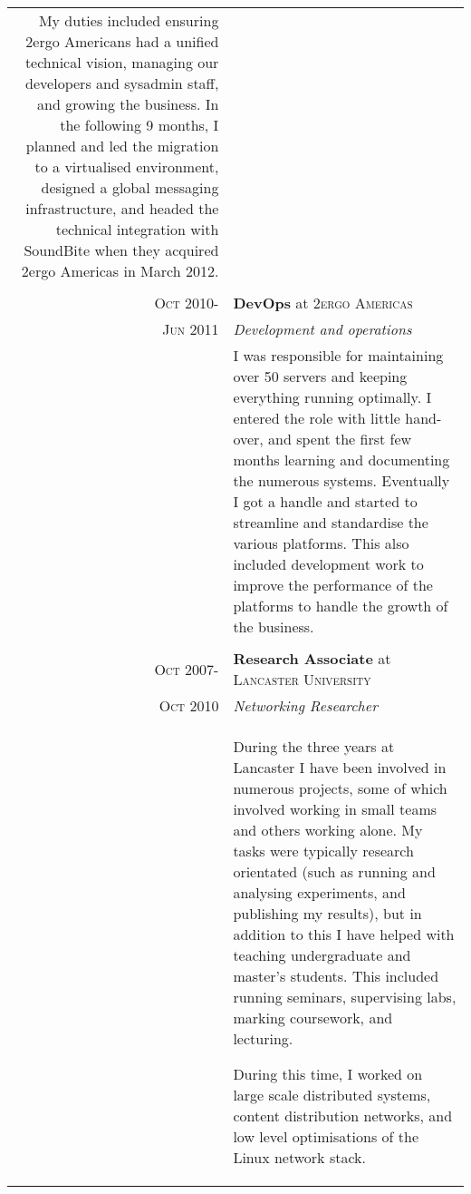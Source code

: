 \documentclass[letterpaper,10pt]{article}
\begin{document}
\begin{tabularx}{\textwidth}{r|X}
                        My duties included ensuring 
			2ergo Americans had a unified technical vision, managing our developers and sysadmin staff, and growing the business.
			In the following 9 months, I planned and led the migration to a virtualised environment, designed a global messaging
			infrastructure, and headed the technical integration with SoundBite when they acquired 2ergo Americas in March 2012. \\
&\\
 \textsc{Oct 2010-} & \textbf{DevOps} at \textsc{2ergo Americas} \\
 \textsc{Jun 2011}  & \emph{Development and operations}\\
                    & I was responsible for maintaining over 50 servers and keeping everything running optimally. 
			I entered the role with little hand-over, and spent the first few months learning and documenting the numerous systems.
			Eventually I got a handle and started to streamline and standardise the various platforms. This also included 
			development work to improve the performance of the platforms to handle the growth of the business. \\
&\\
 \textsc{Oct 2007-} & \textbf{Research Associate} at \textsc{Lancaster University} \\
 \textsc{Oct 2010}  & \emph{Networking Researcher}\\
                    & During the three years at Lancaster I have been involved in numerous projects, some of which involved working in small teams and
			others working alone. My tasks were typically research orientated (such as running and analysing experiments, and publishing my 
			results), but in addition to this I have helped with teaching undergraduate and master's students. This included running seminars,
			supervising labs, marking coursework, and lecturing.

			During this time, I worked on large scale distributed systems, content distribution networks, and low level optimisations of the Linux
			network stack.
			\\


\end{tabularx}

\end{document}

